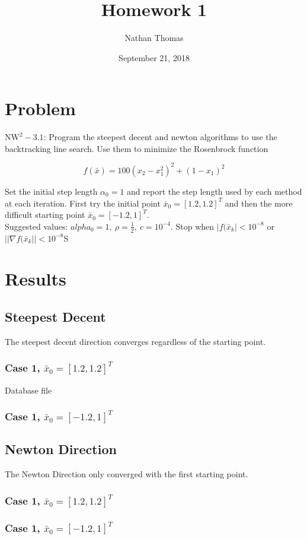 \documentclass[11pt]{article}
\begin{document}
\title{Homework 1}
\author{Nathan Thomas}
\date{September 21, 2018}
\maketitle
\section{Problem}
$\text{NW}^{2}-3.1$: Program the steepest decent and newton algorithms to use the backtracking line search. Use them to minimize the Rosenbrock function

\[
f(\bar{x}) = 100(x_{2}-x_{1}^{2})^{2} + (1-x_{1})^{2}
\]

Set the initial step length $\alpha_{0}=1$ and report the step length used by each method at each iteration. First try the initial point $\bar{x}_{0}=[1.2,1.2]^{T}$ and then the more difficult starting point $\bar{x}_{0}=[-1.2,1]^{T}$.\\

Suggested values: $alpha_{0}=1, \ \rho=\frac{1}{2}, \ c=10^{-4}$. Stop when $|f(\bar{x}_{k}|<10^{-8}$ or $||\nabla f(\bar{x}_{k}||<10^{-8}$S

\section{Results}
\subsection{Steepest Decent}
The steepest decent direction converges regardless of the starting point.
\subsubsection{Case 1, $\bar{x}_{0}=[1.2,1.2]^{T}$}
\begin{table}[t]
	\renewcommand*\dtlrealalign{S}
	\caption{Database file}
	\centering
\end{table}
\subsubsection{Case 1, $\bar{x}_{0}=[-1.2,1]^{T}$}

\subsection{Newton Direction} 
The Newton Direction only converged with the first starting point.
\subsubsection{Case 1, $\bar{x}_{0}=[1.2,1.2]^{T}$}

\subsubsection{Case 1, $\bar{x}_{0}=[-1.2,1]^{T}$}
\end{document}
